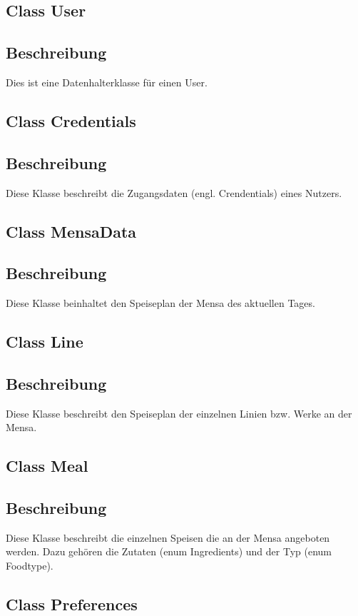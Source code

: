 \documentclass[a4paper]{scrreprt}
\begin{document}
\subsection{Class User}
\subsection*{Beschreibung}
Dies ist eine Datenhalterklasse für einen User.

\subsection{Class Credentials}
\subsection*{Beschreibung}
Diese Klasse beschreibt die Zugangsdaten (engl. Crendentials) eines Nutzers.

\subsection{Class MensaData}
\subsection*{Beschreibung}
Diese Klasse beinhaltet den Speiseplan der Mensa des aktuellen Tages.

\subsection{Class Line}
\subsection*{Beschreibung}
Diese Klasse beschreibt den Speiseplan der einzelnen Linien bzw. Werke an der Mensa.

\subsection{Class Meal}
\subsection*{Beschreibung}
Diese Klasse beschreibt die einzelnen Speisen die an der Mensa angeboten werden.
Dazu gehören die Zutaten (enum Ingredients) und der Typ (enum Foodtype).

\subsection{Class Preferences}
\end{document}
